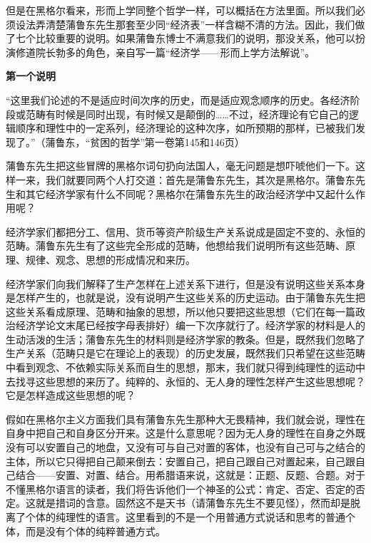 \documentclass[a4paper,twoside,12pt,AutoFakeBold]{ctexart}
\begin{document}
但是在黑格尔看来，形而上学同整个哲学一样，可以概括在方法里面。所以我们必须设法弄清楚蒲鲁东先生那套至少同“经济表”一样含糊不清的方法。因此，我们做了七个比较重要的说明。如果蒲鲁东博士不满意我们的说明，那没关系，他可以扮演修道院长勃多的角色，亲自写一篇“经济学——形而上学方法解说”。

\begin{center}
\textbf{第一个说明}    
\end{center}

\begin{fangsong}
    “这里我们论述的不是适应时间次序的历史，而是适应观念顺序的历史。各经济阶段或范畴有时候是同时出现，有时候又是颠倒的……不过，经济理论有它自己的逻辑顺序和理性中的一定系列，经济理论的这种次序，如所预期的那样，已被我们发现了。”（蒲鲁东，“贫困的哲学”第一卷第145和146页）
\end{fangsong}

蒲鲁东先生把这些冒牌的黑格尔词句扔向法国人，毫无问题是想吓唬他们一下。这样一来，我们就要同两个人打交道：首先是蒲鲁东先生，其次是黑格尔。蒲鲁东先生和其它经济学家有什么不同呢？黑格尔在蒲鲁东先生的政治经济学中又起什么作用呢？

经济学家们都把分工、信用、货币等资产阶级生产关系说成是固定不变的、永恒的范畴。蒲鲁东先生有了这些完全形成的范畴，他想给我们说明所有这些范畴、原理、规律、观念、思想的形成情况和来历。

经济学家们向我们解释了生产怎样在上述关系下进行，但是没有说明这些关系本身是怎样产生的，也就是说，没有说明产生这些关系的历史运动。由于蒲鲁东先生把这些关系看成原理、范畴和抽象的思想，所以他只要把这些思想（它们在每一篇政治经济学论文末尾已经按字母表排好）编一下次序就行了。经济学家的材料是人的生动活泼的生活；蒲鲁东先生的材料则是经济学家的教条。但是，既然我们忽略了生产关系（范畴只是它在理论上的表现）的历史发展，既然我们只希望在这些范畴中看到观念、不依赖实际关系而自生的思想，那末，我们就只得到纯理性的运动中去找寻这些思想的来历了。纯粹的、永恒的、无人身的理性怎样产生这些思想呢？它是怎样造成这些思想的呢？

假如在黑格尔主义方面我们具有蒲鲁东先生那种大无畏精神，我们就会说，理性在自身中把自己和自身区分开来。这是什么意思呢？因为无人身的理性在自身之外既没有可以安置自己的地盘，又没有可与自己对置的客体，也没有自己可与之结合的主体，所以它只得把自己颠来倒去：安置自己，把自己跟自己对置起来，自己跟自己结合——安置、对置、结合。用希腊语来说，这就是：正题、反题、合题。对于不懂黑格尔语言的读者，我们将告诉他们一个神圣的公式：肯定、否定、否定的否定。这就是措词的含意。固然这不是天书（请蒲鲁东先生不要见怪），然而却是脱离了个体的纯理性的语言。这里看到的不是一个用普通方式说话和思考的普通个体，而是没有个体的纯粹普通方式。
\end{document}
